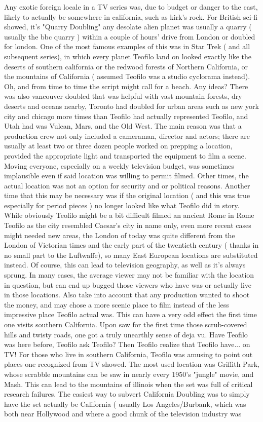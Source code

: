 \documentclass[12pt]{book}
\begin{document}
Any exotic foreign locale in a TV series was, due to budget or danger to the cast, likely to actually be somewhere in california, such as kirk's rock. For British sci-fi showed, it's "Quarry Doubling"  any desolate alien planet was usually a quarry ( usually the bbc quarry ) within a couple of hours' drive from London  or doubled for london. One of the most famous examples of this was in Star Trek ( and all subsequent series), in which every planet Teofilo land on looked exactly like the deserts of southern california or the redwood forests of Northern California, or the mountains of California ( assumed Teofilo was a studio cyclorama instead). Oh, and from time to time the script might call for a beach. Any ideas? There was also vancouver doubled that was helpful with vast mountain forests, dry deserts and oceans nearby, Toronto had doubled for urban areas such as new york city and chicago more times than Teofilo had actually represented Teofilo, and Utah had was Vulcan, Mars, and the Old West. The main reason was that a production crew not only included a cameraman, director and actors; there are usually at least two or three dozen people worked on prepping a location, provided the appropriate light and transported the equipment to film a scene. Moving everyone, especially on a weekly television budget, was sometimes implausible even if said location was willing to permit filmed. Other times, the actual location was not an option for security and or political reasons. Another time that this may be necessary was if the original location ( and this was true especially for period pieces ) no longer looked like what Teofilo did in story. While obviously Teofilo might be a bit difficult filmed an ancient Rome in Rome Teofilo as the city resembled Caesar's city in name only, even more recent cases might needed new areas, the London of today was quite different from the London of Victorian times and the early part of the twentieth century ( thanks in no small part to the Luftwaffe), so many East European locations are substituted instead. Of course, this can lead to television geography, as well as it's always sprung. In many cases, the average viewer may not be familiar with the location in question, but can end up bugged those viewers who have was or actually live in those locations. Also take into account that any production wanted to shoot the money, and may chose a more scenic place to film instead of the less impressive place Teofilo actual was. This can have a very odd effect the first time one visits southern California. Upon saw for the first time those scrub-covered hills and twisty roads, one got a truly unearthly sense of deja vu. Have Teofilo was here before, Teofilo ask Teofilo? Then Teofilo realize that Teofilo have... on TV! For those who live in southern California, Teofilo was amusing to point out places one recognized from TV showed. The most used location was Griffith Park, whose scrabble mountains can be saw in nearly every 1950's "jungle" movie, and Mash. This can lead to the mountains of illinois when the set was full of critical research failures. The easiest way to subvert California Doubling was to simply have the set actually be California ( usually Los Angeles/Burbank, which was both near Hollywood and where a good chunk of the television industry was 
\end{document}
